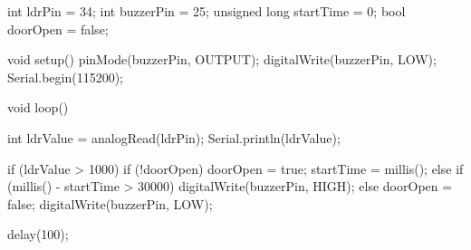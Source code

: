 int ldrPin = 34;
int buzzerPin = 25;
unsigned long startTime = 0;
bool doorOpen = false;

void setup() {
  pinMode(buzzerPin, OUTPUT);
  digitalWrite(buzzerPin, LOW);
  Serial.begin(115200);
}

void loop() {
  int ldrValue = analogRead(ldrPin);
  Serial.println(ldrValue);

  if (ldrValue > 1000) {
    if (!doorOpen) {
      doorOpen = true;
      startTime = millis();
    } else if (millis() - startTime > 30000) {
      digitalWrite(buzzerPin, HIGH);
    }
  } else {
    doorOpen = false;
    digitalWrite(buzzerPin, LOW);
  }

  delay(100);
}
